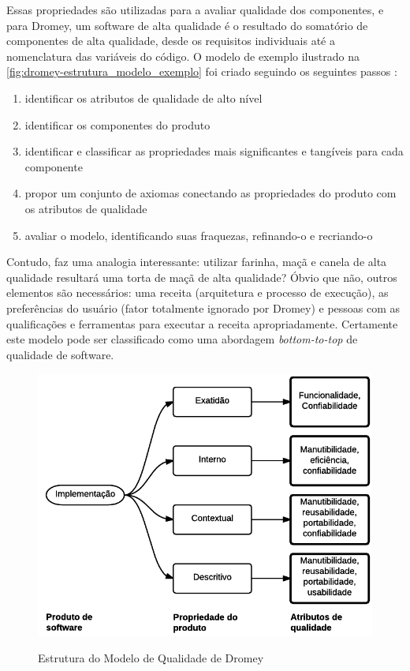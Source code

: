\documentclass[
	12pt,				%
	openright,			%
	oneside,			%
	a4paper,			%
	english,			%
	brazil,				%
	]{abntex2}
\begin{document}
Essas propriedades são utilizadas para a avaliar qualidade dos componentes, e para Dromey, um software de alta qualidade é o resultado do somatório de componentes de alta qualidade, desde os requisitos individuais até a nomenclatura das variáveis do código. O modelo de exemplo ilustrado na \autoref{fig:dromey-estrutura_modelo_exemplo} foi criado seguindo os seguintes passos \cite{PFLEEGER2010}:

\begin{enumerate}
    \item identificar os atributos de qualidade de alto nível
    \item identificar os componentes do produto
    \item identificar e classificar as propriedades mais significantes e tangíveis para cada componente
    \item propor um conjunto de axiomas conectando as propriedades do produto com os atributos de qualidade
    \item avaliar o modelo, identificando suas fraquezas, refinando-o e recriando-o
\end{enumerate}

Contudo,  faz uma analogia interessante: utilizar farinha, maçã e canela de alta qualidade resultará uma torta de maçã de alta qualidade? Óbvio que não, outros elementos são necessários: uma receita (arquitetura e processo de execução), as preferências do usuário (fator totalmente ignorado por Dromey) e pessoas com as qualificações e ferramentas para executar a receita apropriadamente. Certamente este modelo pode ser classificado como uma abordagem \emph{bottom-to-top} de qualidade de software.

\begin{figure}[H]
    \centering
    \caption{Estrutura do Modelo de Qualidade de Dromey}
    \graphicspath{ {./graphics/} }
    \includegraphics[scale=0.85]{dromey-estrutura_modelo-andrei}
    \label{fig:dromey-estrutura_modelo}
\end{figure}
\end{document}
